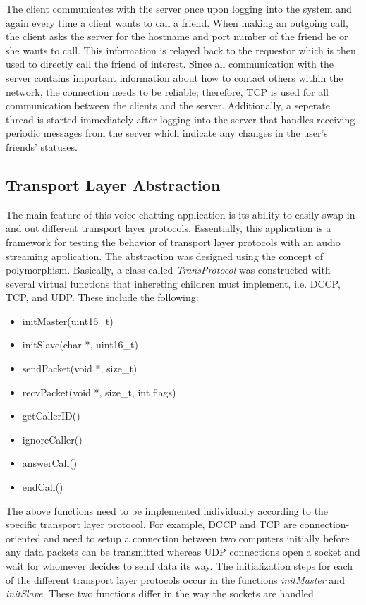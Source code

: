 The client communicates with the server once upon logging into the system and again
every time a client wants to call a friend.  When making an outgoing call,
the client asks the server for the hostname and port number of the friend he or
she wants to call.  This information is relayed back to the requestor which is then
used to directly call the friend of interest.  Since all communication with the
server contains important information about how to contact others within the 
network, the connection needs to be reliable; therefore, TCP is used for all 
communication between the clients and the server. Additionally, a seperate thread
is started immediately after logging into the server that handles receiving
periodic messages from the server which indicate any changes in the user's friends'
statuses. 


\subsection{Transport Layer Abstraction}
\label{subsec:transport_abs}

The main feature of this voice chatting application is its ability to easily 
swap in and out different transport layer protocols.  Essentially, this application
is a framework for testing the behavior of transport layer protocols with an
audio streaming application.  The abstraction was designed using the concept of
polymorphism.  Basically, a class called \textit{TransProtocol} was constructed
with several virtual functions that inhereting children must implement, i.e. DCCP,
TCP, and UDP.  These include the following:

\begin{itemize}
   \item{initMaster(uint16\_t)}
   \item{initSlave(char *, uint16\_t)}
   \item{sendPacket(void *, size\_t)}
   \item{recvPacket(void *, size\_t, int flags)}
   \item{getCallerID()}
   \item{ignoreCaller()}
   \item{answerCall()}
   \item{endCall()}
\end{itemize}

The above functions need to be implemented individually according to the specific
transport layer protocol.  For example, DCCP and TCP are connection-oriented and
need to setup a connection between two computers initially before any data packets 
can be transmitted whereas UDP connections open a socket and wait for 
whomever decides to send data its way.  The initialization steps for each of the
different transport layer protocols occur in the functions \textit{initMaster} and
\textit{initSlave}.  These two functions differ in the way the sockets are handled.

